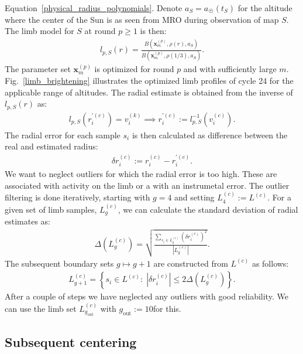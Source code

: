 \documentclass{aa}
\newcommand{\eqnl}[2]{\begin{eqnarray}\label{#1}#2\end{eqnarray}}
\newcommand{\s}[2]{{#1}_{\mathrm{#2}}}
\begin{document}
  Equation~\ref{physical_radius_polynomials}. Denote $a_S = a_{\astrosun}(t_S)$ for the altitude where the center of the Sun is as seen from 
  MRO during observation of map $S$. The limb model for $S$ at round $p \ge 1$ is 
  then:
  \eqnl{calib_limbmodel2}{
  l_{p,S}(r) = \frac{B(\bm{x}_m^{(p)}, \rho(r), a_S)}{B(\bm{x}_m^{(p)}, \rho(1/3), a_S)} \text{.}
  }
  The parameter set $\bm{x}_m^{(p)}$ is optimized for round $p$ and with sufficiently large $m$. Fig.~\ref{limb_brightening} illustrates the optimized limb profiles of cycle 24 for the applicable range of altitudes.
  The radial estimate is obtained from the inverse of $l_{p,S}(r)$ as:
  \eqnl{calib_limbmodel3}{
  l_{p,S}(r_i^{\prime(c)}) = v_i^{(k)} \implies r_i^{\prime(c)} := l_{p,S}^{-1}(v_i^{(c)}) \text{.}
  }
  The radial error for each sample $s_i$ is then calculated as difference between the real and estimated radius:
  \eqnl{calib_deviation1}{
  \delta r_i^{(c)} := r_i^{(c)} - r_i^{\prime(c)} \text{.}
  }
   We want to neglect outliers for which the radial error is too high. These are associated with activity on the limb or 
  a with an instrumetal error. The outlier filtering is done iteratively, starting with $g=4$ and setting $L^{(c)}_4 := 
  L^{(c)}$.
  For a given set of limb samples, $L^{(c)}_g$, we can calculate the standard deviation of radial estimates as:
  \eqnl{calib_deviation2}{
  \Delta \left( L^{(c)}_g \right) = \sqrt{\frac{\sum \limits_{s_i \in L^{(c)}_g} \left( \delta r_i^{(c)} \right)^2}{\left|L^{(c)}_g \right|}} \text{.}
  }
  The subsequent boundary sets $g \mapsto g+1$ are constructed from $L^{(c)}$ as follows:
  \eqnl{calib_deviation3}{
  L^{(c)}_{g+1} = \left\{ s_i \in L^{(c)} : \; \left|\delta r_i^{(c)} \right| \le 2 \Delta \left( L^{(c)}_{g} \right) \right\} \text{.}
  }
  After a couple of steps we have neglected any outliers with good reliability. We can use the limb set $L^{(c)}_{\s{g}{out}}$ with $\s{g}{out} := 10$for this.

  \subsection{Subsequent centering} \label{sect:subsequent_centering}
\end{document}
